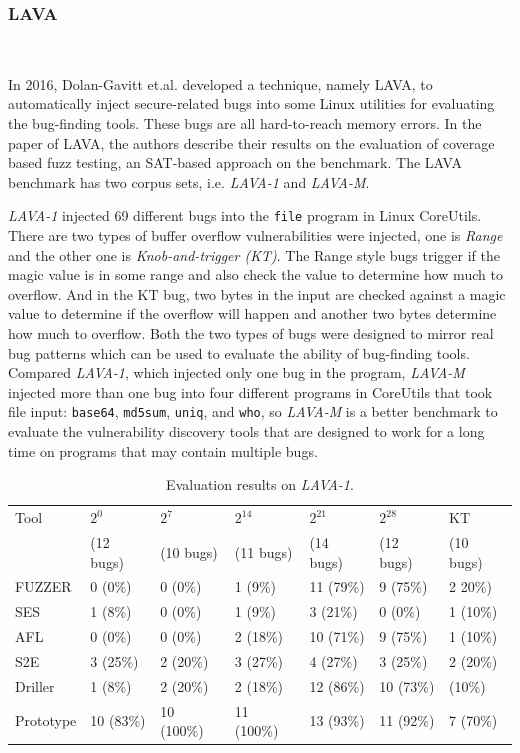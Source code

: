 \subsubsection{LAVA}~\par
\vskip0.5mm
\noindent In 2016, Dolan-Gavitt et.al. developed a technique, namely LAVA, to automatically inject secure-related bugs into some Linux utilities for evaluating the bug-finding tools. These bugs are all hard-to-reach memory errors. In the paper of LAVA, the authors describe their results on the evaluation of coverage based fuzz testing, an SAT-based approach on the benchmark. The LAVA benchmark has two corpus sets, i.e. \textit{LAVA-1} and \textit{LAVA-M}.

\textit{LAVA-1} injected 69 different bugs into the \texttt{file} program in Linux CoreUtils. There are two types of buffer overflow vulnerabilities were injected, one is \emph{Range} and the other one is \emph{Knob-and-trigger (KT)}. The Range style bugs trigger if the magic value is in some range and also check the value to determine how much to overflow. And in the KT bug, two bytes in the input are checked against a magic value to determine if the overflow will happen and another two bytes determine how much to overflow. Both the two types of bugs were designed to mirror real bug patterns which can be used to evaluate the ability of bug-finding tools. Compared \textit{LAVA-1}, which injected only one bug in the program, \textit{LAVA-M} injected more than one bug into four different programs in CoreUtils that took file input: \texttt{base64}, \texttt{md5sum}, \texttt{uniq}, and \texttt{who}, so \textit{LAVA-M} is a better benchmark to evaluate the vulnerability discovery tools that are designed to work for a long time on programs that may contain multiple bugs.

\begin{table}
  \caption{\label{LAVA-1}Evaluation results on \textit{LAVA-1}.}
  \centering
	\begin{tabular}{p{2cm}<{\centering} p{1.5cm}<{\centering} p{1.6cm}<{\centering}  p{1.6cm}<{\centering}	p{1.5cm}<{\centering} p{1.5cm}<{\centering}  p{1.5cm}<{\centering} }
		\toprule
	    Tool & $2^0$ & $2^7$  & $2^{14}$ & $2^{21}$ & $2^{28}$ & KT \\
	         & (12 bugs) & (10 bugs) & (11 bugs) & (14 bugs) & (12 bugs) & (10 bugs) \\
		\midrule
		FUZZER 		& 0 (0\%)   & 0 (0\%)    & 1 (9\%)    & 11 (79\%) & 9 (75\%)  & 2 20\%) \\
		SES	        & 1 (8\%)   & 0 (0\%)    & 1 (9\%)    & 3 (21\%)  & 0 (0\%)   & 1 (10\%) \\
		AFL		    & 0 (0\%)   & 0 (0\%)    & 2 (18\%)   & 10 (71\%) & 9 (75\%)  & 1 (10\%) \\
		S2E			& 3 (25\%)  & 2 (20\%)   & 3 (27\%)   & 4 (27\%)  & 3 (25\%)  & 2 (20\%) \\
		Driller		& 1 (8\%)   & 2 (20\%)   & 2 (18\%)   & 12 (86\%) & 10 (73\%) &  (10\%) \\
		Prototype	& 10 (83\%) & 10 (100\%) & 11 (100\%) & 13 (93\%) & 11 (92\%) & 7 (70\%) \\
	 \bottomrule
	\end{tabular}
\end{table}


